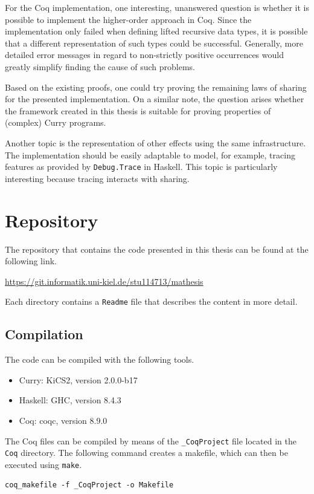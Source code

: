 \documentclass[a4paper, 11pt, fleqn, twoside, abstract=on]{scrreprt}
\newcommand{\hinl}[1]{\texttt{#1}}
\newcommand{\cinl}[1]{\texttt{#1}}
\begin{document}
For the Coq implementation, one interesting, unanswered question is whether it is possible to implement the higher-order approach in Coq.
Since the implementation only failed when defining lifted recursive data types, it is possible that a different representation of such types could be successful.
Generally, more detailed error messages in regard to non-strictly positive occurrences would greatly simplify finding the cause of such problems.

Based on the existing proofs, one could try proving the remaining laws of sharing for the presented implementation. On a similar note, the question arises whether the framework created in this thesis is suitable for proving properties of (complex) Curry programs.

Another topic is the representation of other effects using the same infrastructure.
The implementation should be easily adaptable to model, for example, tracing features as provided by \hinl{Debug.Trace} in Haskell.
This topic is particularly interesting because tracing interacts with sharing.


\appendix
\chapter{Repository}
The repository that contains the code presented in this thesis can be found at the following link.

\vspace*{.5cm}
\url{https://git.informatik.uni-kiel.de/stu114713/mathesis}
\vspace*{.5cm}

\noindent
Each directory contains a \texttt{Readme} file that describes the content in more detail.

\section{Compilation}

The code can be compiled with the following tools.

\begin{itemize}
\item Curry: KiCS2, version 2.0.0-b17
\item Haskell: GHC, version 8.4.3
\item Coq: coqc, version 8.9.0
\end{itemize}

The Coq files can be compiled by means of the \cinl{_CoqProject} file located in the \cinl{Coq} directory.
The following command creates a makefile, which can then be executed using \texttt{make}.

\begin{verbatim}
coq_makefile -f _CoqProject -o Makefile
\end{verbatim}
\end{document}
